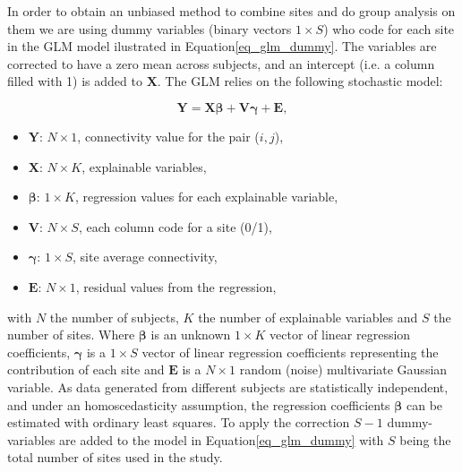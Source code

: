 \documentclass[authoryear]{elsarticle}
\begin{document}
In order to obtain an unbiased method to combine sites and do group analysis on them we are using dummy variables (binary vectors $1\times S$) who code for each site in the GLM model ilustrated in Equation\ref{eq_glm_dummy}. The variables are corrected to have a zero mean across subjects, and an intercept (i.e. a column filled with 1) is added to $\mathbf{X}$. The GLM relies on the following stochastic model:

\begin{equation}
 \label{eq_glm_dummy}
  \mathbf{Y} = \mathbf{X}\mathbf{\beta} + \mathbf{V}\mathbf{\gamma}+ \mathbf{E},
\end{equation}
\begin{itemize}
  \item $\mathbf{Y}$: $N\times 1$, connectivity value for the pair ($i,j$),
  \item $\mathbf{X}$: $N\times K$, explainable variables,
  \item $\mathbf{\beta}$: $1 \times K$, regression values for each explainable variable,
  \item $\mathbf{V}$: $N\times S$, each column code for a site (0/1),
  \item $\mathbf{\gamma}$: $1\times S$, site average connectivity,
  \item $\mathbf{E}$: $N\times 1$, residual values from the regression,
\end{itemize}
 
with $N$ the number of subjects, $K$ the number of explainable variables and $S$ the number of sites. Where $\mathbf{\beta}$ is an unknown $1\times K$ vector of linear regression coefficients, $\mathbf{\gamma}$ is a $1\times S$ vector of linear regression coefficients representing the contribution of each site and $\mathbf{E}$ is a $N\times 1$ random (noise) multivariate Gaussian variable. As data generated from different subjects are statistically independent, and under an homoscedasticity assumption, the regression coefficients $\mathbf{\beta}$ can be estimated with ordinary least squares. To apply the correction $S-1$ dummy-variables are added to the model in Equation\ref{eq_glm_dummy} with $S$ being the total number of sites used in the study.
\end{document}
